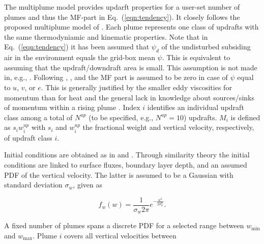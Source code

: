 \documentclass[dvipdfmx,a4paper,10pt]{article}
\begin{document}
The multiplume model provides updarft properties for a user-set number of plumes and thus the MF-part in Eq.~(\ref{eqn:tendency}). It closely follows the proposed multiplume model of \cite{cheinet03a}. Each plume represents one class of updrafts with the same thermodyniamic and kinematic properties. Note that in Eq.~(\ref{eqn:tendency}) it has been assumed that $\psi_d$ of the undisturbed subsiding air in the environment equals the grid-box mean $\psi$. This is equivalent to assuming that the updraft/downdraft area is small. This assumption is not made in, e.g., \cite{cheinet03a}. Following \cite{suselj12}, \cite{suselj13}, and \cite{suselj14} the MF part is assumed to be zero in case of $\psi$ equal to $u$, $v$, or $e$. This is generally justified by the smaller eddy viscosities for momentum than for heat and the general lack in knowledge about sources/sinks of momentum within a rising plume \citep[see, e.g., discussion in][]{han15}. Index $i$ identifies an individual updraft class among a total of $N^{up}$ (to be specified, e.g., $N^{up}=10$) updrafts. $M_i$ is defined as $s_i w^{up}_i$ with $s_i$ and $w^{up}_i$ the fractional weight and vertical velocity, respectively, of updraft class $i$. 


Initial conditions are obtained as in \cite{cheinet03a} and \cite{lenschow80}. Through similarity theory the initial conditions are linked to surface fluxes, boundary layer depth, and an assumed PDF of the vertical velocity. The latter is assumed to be a Gaussian with standard deviation $\sigma_w$, given as

\begin{equation}
 f_w(w) = \frac{1}{\sigma_w 2 \pi } e^{-\frac{w^2}{2\sigma_w^2}}.
\end{equation}


A fixed number of plumes spans a discrete PDF for a selected range between $w_{\mathrm{min}}$ and $w_{\mathrm{max}}$. Plume $i$ covers all vertical velocities between
\end{document}
